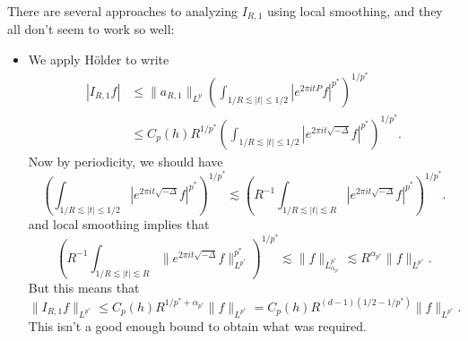 There are several approaches to analyzing $I_{R,1}$ using local smoothing, and they all don't seem to work so well:
%
\begin{itemize}
    \item We apply H\"{o}lder to write
    \begin{align*}
        |I_{R,1} f| &\leq \| a_{R,1} \|_{L^p} \left( \int_{1/R \lesssim |t| \leq 1/2} |e^{2 \pi i t P} f|^{p^*} \right)^{1/p^*}\\
        &\leq C_p(h) R^{1/p^*} \left( \int_{1/R \lesssim |t| \leq 1/2} |e^{2 \pi i t \sqrt{-\Delta}} f|^{p^*} \right)^{1/p^*}.
    \end{align*}
    Now by periodicity, we should have
    \[ \left( \int_{1/R \lesssim |t| \leq 1/2} |e^{2 \pi i t \sqrt{-\Delta}} f|^{p^*} \right)^{1/p^*} \lesssim \left( R^{-1} \int_{1/R \lesssim |t| \lesssim R} |e^{2 \pi i t \sqrt{-\Delta}} f|^{p^*} \right)^{1/p^*}. \]
    and local smoothing implies that
    \[ \left( R^{-1} \int_{1/R \lesssim |t| \lesssim R} \| e^{2 \pi i t \sqrt{-\Delta}} f \|_{L^{p^*}}^{p^*} \right)^{1/p^*} \lesssim \| f \|_{L^{p^*}_{\alpha_{p^*}}} \lesssim R^{\alpha_{p^*}} \| f \|_{L^{p^*}}. \]
    But this means that
    \[ \| I_{R,1} f \|_{L^{p^*}} \leq C_p(h) R^{1/p^* + \alpha_{p^*}} \| f \|_{L^{p^*}} = C_p(h) R^{(d-1)(1/2 - 1/p^*)} \| f \|_{L^{p^*}}. \]
    This isn't a good enough bound to obtain what was required.


\end{itemize}
